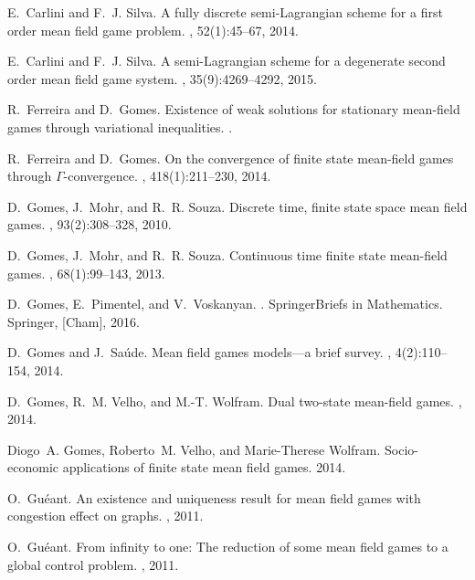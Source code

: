\documentclass[12pt]{amsart}
\newcommand{\1}{{\chi}}
\theoremstyle{definition}
\begin{document}
\begin{thebibliography}{10}
	E.~Carlini and F.~J. Silva.
	\newblock A fully discrete semi-{L}agrangian scheme for a first order mean
	field game problem.
	, 52(1):45--67, 2014.
	
	E.~Carlini and F.~J. Silva.
	\newblock A semi-{L}agrangian scheme for a degenerate second order mean field
	game system.
	, 35(9):4269--4292, 2015.
	
	R.~Ferreira and D.~Gomes.
	\newblock Existence of weak solutions for stationary mean-field games through
	variational inequalities.
	.
	
	R.~Ferreira and D.~Gomes.
	\newblock On the convergence of finite state mean-field games through
	{$\Gamma$}-convergence.
	, 418(1):211--230, 2014.
	
	D.~Gomes, J.~Mohr, and R.~R. Souza.
	\newblock Discrete time, finite state space mean field games.
	,
	93(2):308--328, 2010.
	
	D.~Gomes, J.~Mohr, and R.~R. Souza.
	\newblock Continuous time finite state mean-field games.
	, 68(1):99--143, 2013.
	
	D.~Gomes, E.~Pimentel, and V.~Voskanyan.
	.
	\newblock SpringerBriefs in Mathematics. Springer, [Cham], 2016.
	
	D.~Gomes and J.~Sa{\'u}de.
	\newblock Mean field games models---a brief survey.
	, 4(2):110--154, 2014.
	
	D.~Gomes, R.~M. Velho, and M.-T. Wolfram.
	\newblock Dual two-state mean-field games.
	, 2014.
	
	Diogo~A. Gomes, Roberto~M. Velho, and Marie-Therese Wolfram.
	\newblock Socio-economic applications of finite state mean field games.
	 2014.
	
	O.~Gu{\'e}ant.
	\newblock An existence and uniqueness result for mean field games with
	congestion effect on graphs.
	, 2011.
	
	O.~Gu{\'e}ant.
	\newblock From infinity to one: The reduction of some mean field games to a
	global control problem.
	, 2011.
	

\end{thebibliography}
\end{document}
